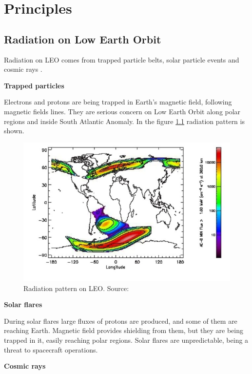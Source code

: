\chapter{Principles}

\section{Radiation on Low Earth Orbit}
    Radiation on LEO comes from trapped particle belts, solar particle events and cosmic rays \cite{ESA_radiation}.

    \bigskip \textbf{Trapped particles}

    Electrons and protons are being trapped in Earth's magnetic field, following magnetic fields lines. They are serious concern on Low Earth Orbit along polar regions and inside South Atlantic Anomaly. In the figure \ref{Polar_SAA} radiation pattern is shown.

    \begin{figure}[H]
        \centering
        \includegraphics[width=0.6\paperwidth]{img/03/polar_SAA.png}
        \caption{Radiation pattern on LEO. Source: \cite{ESA_radiation}}
        \label{Polar_SAA}
    \end{figure}

    \bigskip \textbf{Solar flares}

    During solar flares large fluxes of protons are produced, and some of them are reaching Earth. Magnetic field provides shielding from them, but they are being trapped in it, easily reaching polar regions. Solar flares are unpredictable, being a threat to spacecraft operations.

    \bigskip \textbf{Cosmic rays}

